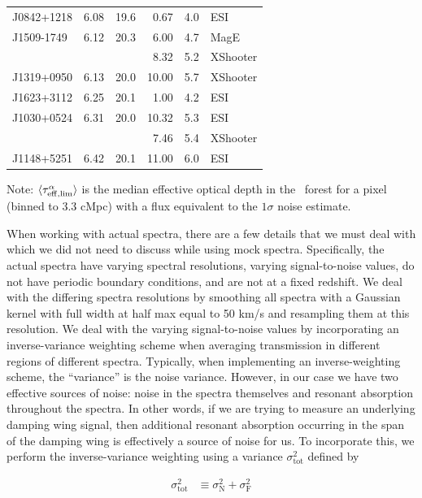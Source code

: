 \begin{table}
\begin{center}
\begin{tabular}{lrrrrl}
J0842+1218 &    6.08 &   19.6 &    0.67 &    4.0 & ESI \\
J1509-1749 &    6.12 &   20.3 &    6.00 &    4.7 & MagE \\
           &         &        &    8.32 &    5.2 & XShooter \\
J1319+0950 &    6.13 &   20.0 &   10.00 &    5.7 & XShooter \\
J1623+3112 &    6.25 &   20.1 &    1.00 &    4.2 & ESI \\
J1030+0524 &    6.31 &   20.0 &   10.32 &    5.3 & ESI \\
           &         &        &    7.46 &    5.4 & XShooter \\
J1148+5251 &    6.42 &   20.1 &   11.00 &    6.0 & ESI \\
 \hline
 \end{tabular}
 \end{center}
 Note: $\langle\tau_{\rm eff,lim}^\alpha\rangle$ is the median effective optical depth in
       the \lya\ forest for a pixel (binned to 3.3 cMpc) with a flux equivalent to the $1\sigma$
       noise estimate.
\end{table}


When working with actual spectra, there are a few details that we must deal with which we did not need to discuss while using mock spectra. Specifically, the actual spectra have varying spectral resolutions, varying signal-to-noise values, do not have periodic boundary conditions, and are not at a fixed redshift. We deal with the differing spectra resolutions by smoothing all spectra with a Gaussian kernel with full width at half max equal to 50 km/s and resampling them at this resolution. We deal with the varying signal-to-noise values by incorporating an inverse-variance weighting scheme when averaging transmission in different regions of different spectra. Typically, when implementing an inverse-weighting scheme, the ``variance'' is the noise variance. However, in our case we have two effective sources of noise: noise in the spectra themselves and resonant absorption throughout the spectra. In other words, if we are trying to measure an underlying damping wing signal, then additional resonant absorption occurring in the span of the damping wing is effectively a source of noise for us. To incorporate this, we perform the inverse-variance weighting using a variance $\sigma_{\text{tot}}^{2}$ defined by 

\begin{align}
\sigma_{\text{tot}}^{2} &\equiv \sigma_{\text{N}}^{2} + \sigma_{\text{F}}^{2}
\end{align}

